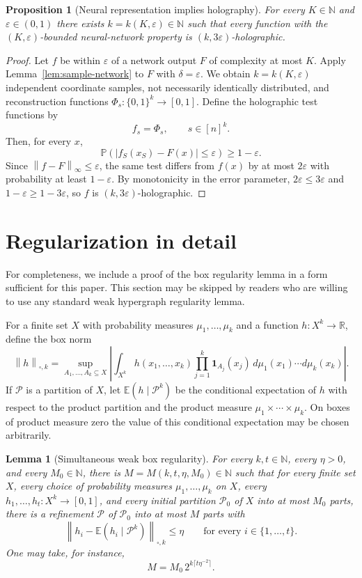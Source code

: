 \documentclass[11pt]{amsart}
\newtheorem{lemma}[theorem]{Lemma}
\newtheorem{proposition}[theorem]{Proposition}
\newcommand{\E}{\mathbb E}
\newcommand{\Pp}{\mathbb P}
\newcommand{\N}{\mathbb N}
\newcommand{\R}{\mathbb R}
\newcommand{\1}{\mathbf 1}
\newcommand{\cube}{\{0,1\}}
\newcommand{\norm}[1]{\left\lVert #1\right\rVert}
\newcommand{\abs}[1]{\left\lvert #1\right\rvert}
\begin{document}
\begin{proposition}[Neural representation implies holography]\label{prop:nn-holo}
For every $K\in\N$ and $\varepsilon\in(0,1)$ there exists $k=k(K,\varepsilon)\in\N$ such that every function with the $(K,\varepsilon)$-bounded neural-network property is $(k,3\varepsilon)$-holographic.
\end{proposition}

\begin{proof}
Let $f$ be within $\varepsilon$ of a network output $F$ of complexity at most $K$.  Apply Lemma~\ref{lem:sample-network} to $F$ with $\delta=\varepsilon$.  We obtain $k=k(K,\varepsilon)$ independent coordinate samples, not necessarily identically distributed, and reconstruction functions $\Phi_s:\cube^k\to[0,1]$.  Define the holographic test functions by
\[
        f_s=\Phi_s,\qquad s\in[n]^k .
\]
Then, for every $x$,
\[
        \Pp(\abs{f_S(x_S)-F(x)}\leq\varepsilon)\geq1-\varepsilon.
\]
Since $\norm{f-F}_\infty\leq\varepsilon$, the same test differs from $f(x)$ by at most $2\varepsilon$ with probability at least $1-\varepsilon$.  By monotonicity in the error parameter, $2\varepsilon\leq3\varepsilon$ and $1-\varepsilon\geq1-3\varepsilon$, so $f$ is $(k,3\varepsilon)$-holographic.
\end{proof}



\section{Regularization in detail}\label{sec:regularization}

For completeness, we include a proof of the box regularity lemma in a form sufficient for this paper.  This section may be skipped by readers who are willing to use any standard weak hypergraph regularity lemma.

For a finite set $X$ with probability measures $\mu_1,\ldots,\mu_k$ and a function $h:X^k\to\R$, define the box norm
\[
        \norm{h}_{\square,k}
        =\sup_{A_1,\ldots,A_k\subseteq X}
        \left|\int_{X^k}h(x_1,\ldots,x_k)
        \prod_{j=1}^k\1_{A_j}(x_j)\,
        d\mu_1(x_1)\cdots d\mu_k(x_k)\right|.
\]
If $\mathcal P$ is a partition of $X$, let $\E(h\mid\mathcal P^k)$ be the conditional expectation of $h$ with respect to the product partition and the product measure $\mu_1\times\cdots\times\mu_k$.  On boxes of product measure zero the value of this conditional expectation may be chosen arbitrarily.

\begin{lemma}[Simultaneous weak box regularity]\label{lem:weak-box}
For every $k,t\in\N$, every $\eta>0$, and every $M_0\in\N$, there is $M=M(k,t,\eta,M_0)\in\N$ such that for every finite set $X$, every choice of probability measures $\mu_1,\ldots,\mu_k$ on $X$, every $h_1,\ldots,h_t:X^k\to[0,1]$, and every initial partition $\mathcal P_0$ of $X$ into at most $M_0$ parts, there is a refinement $\mathcal P$ of $\mathcal P_0$ into at most $M$ parts with
\[
        \norm{h_i-\E(h_i\mid\mathcal P^k)}_{\square,k}\leq\eta
        \qquad\text{for every }i\in\{1,\ldots,t\}.
\]
One may take, for instance,
\[
        M=M_0\,2^{k\lceil t\eta^{-2}\rceil}.
\]
\end{lemma}
\end{document}
